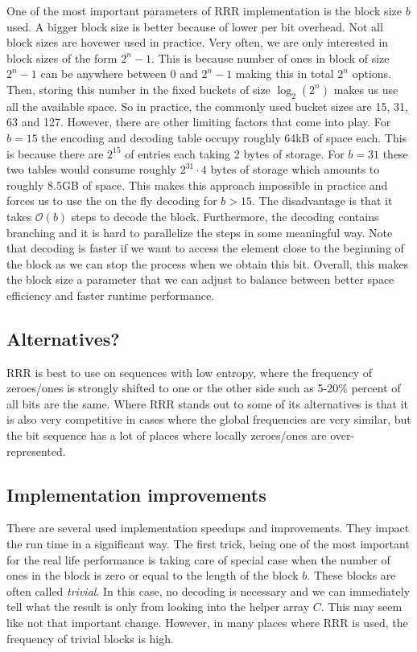 One of the most important parameters of RRR implementation is the block
size $b$ used. A bigger block size is better because of lower per bit overhead. Not
all block sizes are hovewer used in practice. Very often, we are only interested in
block sizes of the form $2^n-1$. This is because number of ones in block of size $2^n-1$
can be anywhere between $0$ and $2^n-1$ making this in total $2^n$ options. Then, storing
this number in the fixed buckets of size $\log_2(2^n)$ makes us use all the available space.
So in practice, the commonly used bucket sizes are 15, 31, 63 and 127. However, there are
other limiting factors that come into play. For $b=15$ the encoding and decoding table
occupy roughly 64kB of space each. This is because there are $2^{15}$ of entries each taking
2 bytes of storage. For $b=31$ these two tables would consume roughly $2^{31}\cdot 4$ bytes
of storage which amounts to roughly 8.5GB of space. This makes this approach impossible in
practice and forces us to use the on the fly decoding for $b>15$. The disadvantage
is that it takes $\mathcal{O}(b)$ steps to decode the block. Furthermore, the decoding
contains branching and it is hard to parallelize the steps in some meaningful way.
Note that decoding is faster if we want to access the element close to the beginning of
the block as we can stop the process when we obtain this bit. Overall, this makes the block
size a parameter that we can adjust to balance between better space efficiency and faster
runtime performance.


\subsection{Alternatives?}

RRR is best to use on sequences with low entropy, where the frequency of zeroes/ones is
strongly shifted to one or the other side such as 5-20\% percent of all bits are the same.
Where RRR stands out to some of its alternatives is that it is also very competitive in
cases where the global frequencies are very similar, but the bit sequence has a lot of places
where locally zeroes/ones are over-represented.

\subsection{Implementation improvements}

There are several used implementation speedups and improvements. They impact the run time in a
significant way. The first trick, being one of the most important for the real
life performance is taking care of special case when the number of ones in the block is zero
or equal to the length of the block $b$. These blocks are often called \textit{trivial}. In this
case, no decoding is necessary and we can immediately tell what the result is only from looking
into the helper array $C$. This may seem like not that important change. However, in many places
where RRR is used, the frequency of trivial blocks is high.
